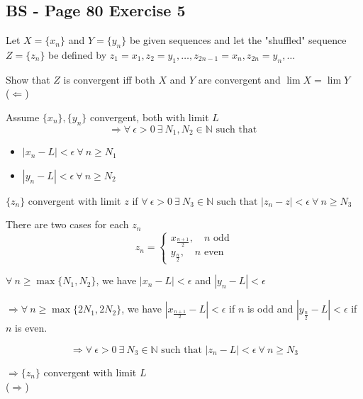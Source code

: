\documentclass{article}
\begin{document}
\subsection*{BS - Page 80 Exercise 5}
Let \(X = \{x_n\}\) and \(Y = \{y_n\}\) be given sequences and let the "shuffled" 
sequence \(Z= \{z_n\}\) be defined by \(z_1 = x_1, z_2 = y_1, \dots, z_{2n-1} = x_n, z_{2n} = y_n, \dots\) 

Show that \(Z\) is convergent iff both \(X\) and \(Y\) are convergent and \(\lim X = \lim Y\)
\\

(\(\Leftarrow\))

Assume \(\{x_n\}, \{y_n\}\) convergent, both with limit \(L\)
\[
\Rightarrow \forall \ \epsilon >0 \ \exists \ N_1, N_2 \in \mathbb{N} \text{ such that }
\]
\begin{itemize}
    \item \(|x_n - L| < \epsilon  \ \forall \ n \geq N_1\)
    \item \(|y_n - L| < \epsilon  \ \forall \ n \geq N_2\)
\end{itemize}

\(\{z_n\}\) convergent  with limit \(z\) if \(\forall \ \epsilon > 0 \ \exists \ N_3 \in \mathbb{N} 
\text{ such that } |z_n -z| < \epsilon \ \forall \ n \geq N_3 \)

There are two cases for each \(z_n\)
\[
z_n = \begin{cases}
    x_{\frac{n+1}{2}}, \quad n \text{ odd} \\
    y_{\frac{n}{2}}, \quad n \text{ even}
\end{cases}
\]

\(\forall \ n \geq \max\{N_1, N_2\}\), we have \(|x_n - L| < \epsilon \) and \(|y_n -L| < \epsilon \)

\(\Rightarrow \forall \ n \geq \max\{2N_1, 2N_2\}\), we have \(|x_{\frac{n+1}{2}} - L| < \epsilon \) if \(n\) is odd
and \(|y_{\frac{n}{2}} -L| < \epsilon \) if \(n\) is even.

\[
\Rightarrow \forall \ \epsilon >0 \ \exists \ N_3 \in \mathbb{N} \text{ such that } |z_n - L| < \epsilon  \ \forall \ n \geq N_3
\]

\(\Rightarrow \{z_n\}\) convergent with limit \(L\)
\\

(\(\Rightarrow\))
\end{document}
